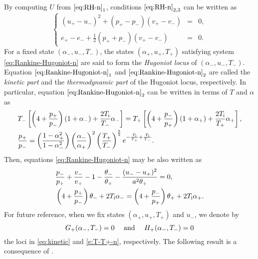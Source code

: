 \documentclass[10pt,a4paper]{article}
\numberwithin{equation}{section}
\newcommand{\Ti}{T_{\rm i}}
\begin{document}
\noindent By computing $U$ from $\eqref{eq:RH-n}_1$, conditions $\eqref{eq:RH-n}_{2,3}$ can be written as
\begin{equation}\label{eq:Rankine-Hugoniot-n}
\left\{\begin{array}{rcl}
        (u_+ - u_-)^2  + (p_+ - p_-)(v_+ - v_-) & = & 0,\\[1mm]
        e_+ -  e_- + \frac{1}{2}(p_+ + p_-)(v_+ - v_-) & = & 0.
                \end{array}\right.
\end{equation}
For a fixed state $(\alpha_-,u_-,T_-)$, the states $(\alpha_+,u_+,T_+)$ satisfying system \eqref{eq:Rankine-Hugoniot-n} are said to form the {\em Hugoniot locus} of $(\alpha_-,u_-,T_-)$. Equation $\eqref{eq:Rankine-Hugoniot-n}_1$ and $\eqref{eq:Rankine-Hugoniot-n}_2$ are called the {\em kinetic part} and the {\em thermodynamic part} of the Hugoniot locus, respectively. In particular, equation $\eqref{eq:Rankine-Hugoniot-n}_2$ can be written in terms of $T$ and $\alpha$ as
\begin{align}
 &T_-\left[\left(4 + \frac{p_+}{p_-}\right)(1 + \alpha_-) +  \frac{2\Ti}{T_{-}}\alpha_-\right] 
=  T_+\left[\left(4 + \frac{p_-}{p_+}\right)(1 + \alpha_+) +  \frac{2\Ti}{T_{+}}\alpha_+\right],\label{eq:T_-/T_+prop-n}\\
&\frac{p_+}{p_-} 
= \left(\frac{1 - \alpha_+^2}{1 - \alpha_-^2}\right)\left(\frac{\alpha_-}{\alpha_+}\right)^2 \left(\frac{T_{+}}{T_{-}}\right)^{\frac{5}{2}}
e^{-\frac{\Ti}{T_{+}} + \frac{\Ti}{T_{-}}}. \label{eq:p_+/p_-}
\end{align}
Then, equations \eqref{eq:Rankine-Hugoniot-n} may be also written as 
\begin{align}
\label{eq:kinetic}
&\frac{p_-}{p_+} + \frac{v_-}{v_+} - 1 -  \frac{\theta_-}{\theta_+}   -  \frac{ (u_- - u_+)^2}{a^2\theta_+} = 0,
\\
\label{e:T-T+-n}
&    \left(4 + \frac{p_+}{p_-}\right)\theta_- + 2\Ti\alpha_- = \left(4 + \frac{p_-}{p_+}\right)\theta_+ + 2\Ti\alpha_+.
\end{align}
For future reference, when we fix states $(\alpha_+,u_+,T_+)$ and $u_-$, we denote by 
\begin{equation}\label{e:GH}
G_+(\alpha_-,T_-)=0\quad  \hbox{ and } \quad H_+(\alpha_-,T_-)=0 
\end{equation}
the loci in \eqref{eq:kinetic} and \eqref{e:T-T+-n}, respectively. The following result is a consequence of  \cite[Prop. 5.3, Th. 5.1]{Asakura-Corli_ionized}.
\end{document}

